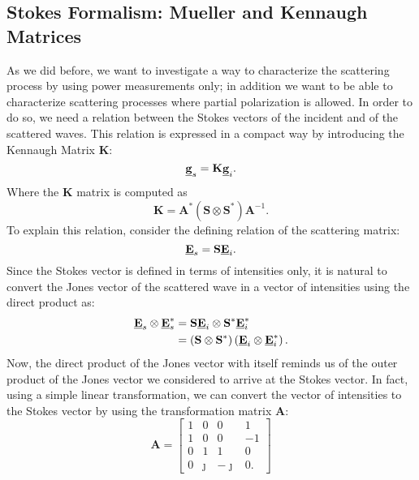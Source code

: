 \documentclass[11pt]{article}
\begin{document}
\subsection{Stokes Formalism: Mueller and Kennaugh Matrices}
As we did before, we want to investigate a way to characterize the scattering process by using power measurements only; in addition we want to be able to characterize scattering processes where partial polarization is allowed. In order to do so, we need a relation between the Stokes vectors of the incident and of the scattered waves. This relation is expressed in a compact way by introducing the Kennaugh Matrix $\mathbf{K}$:
\begin{equation}
	\mathbf{\underline{g}}_{s} = \mathbf{K} \mathbf{\underline{g}}_{i}.
\end{equation}
Where the $\mathbf{K}$ matrix is computed as 
\begin{equation}\label{eq:kennaugh}
	\mathbf{K} = \mathbf{A}^{*}\left(\mathbf{S}\otimes\mathbf{S}^{*}\right)\mathbf{A}^{-1}.
\end{equation}
To explain this relation, consider the defining relation of the scattering matrix:
\begin{equation}
	\mathbf{\underline{E}}_{s} = \mathbf{S}\mathbf{\underline{E}}_{i}.
\end{equation}
Since the Stokes vector is defined in terms of intensities only, it is natural to convert the Jones vector of the scattered wave in a vector of intensities using the direct product as\cite{Fujiwara2007}:
\begin{equation}
	\begin{split}
	\mathbf{\underline{E}}_{s}\otimes\mathbf{\underline{E}}_{s}^{*} &= \mathbf{S}\mathbf{\underline{E}}_{i}\otimes \mathbf{S}^{*}\mathbf{\underline{E}}_{i}^{*}\\
	&= \left(\mathbf{S}\otimes\mathbf{S}^{*}\right)\left(\mathbf{\underline{E}}_{i}\otimes\mathbf{\underline{E}}_{i}^{*}\right).
	\end{split}
\end{equation}
Now, the direct product of the Jones vector with itself reminds us of the outer product of the Jones vector we considered to arrive at the Stokes vector. In fact, using a simple linear transformation, we can convert the vector of intensities to the Stokes vector by using the transformation matrix $\mathbf{A}$:
\begin{equation}
	\mathbf{A} = 
	\begin{bmatrix}
		1 & 0 & 0 & 1\\
		1 & 0 & 0 & -1\\
		0 & 1 & 1 & 0\\
		0 & \jmath & -\jmath & 0.
	\end{bmatrix}
\end{equation}
\end{document}
